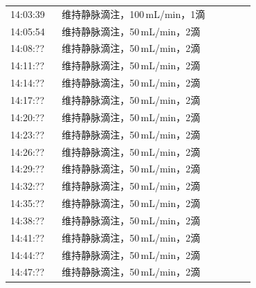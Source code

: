 \documentclass[UTF8,10pt,a4paper,fontset=fandol]{ctexart}
\newcommand{\fieldvalue}[1]{#1}
\begin{document}
\begin{tabular}{p{0.18\linewidth}p{0.68\linewidth}}
14:03:39 & \fieldvalue{维持静脉滴注，100\,mL/min，1滴} \\[2pt]
14:05:54 & \fieldvalue{维持静脉滴注，50\,mL/min，2滴} \\[2pt]
14:08:?? & \fieldvalue{维持静脉滴注，50\,mL/min，2滴} \\[2pt]
14:11:?? & \fieldvalue{维持静脉滴注，50\,mL/min，2滴} \\[2pt]
14:14:?? & \fieldvalue{维持静脉滴注，50\,mL/min，2滴} \\[2pt]
14:17:?? & \fieldvalue{维持静脉滴注，50\,mL/min，2滴} \\[2pt]
14:20:?? & \fieldvalue{维持静脉滴注，50\,mL/min，2滴} \\[2pt]
14:23:?? & \fieldvalue{维持静脉滴注，50\,mL/min，2滴} \\[2pt]
14:26:?? & \fieldvalue{维持静脉滴注，50\,mL/min，2滴} \\[2pt]
14:29:?? & \fieldvalue{维持静脉滴注，50\,mL/min，2滴} \\[2pt]
14:32:?? & \fieldvalue{维持静脉滴注，50\,mL/min，2滴} \\[2pt]
14:35:?? & \fieldvalue{维持静脉滴注，50\,mL/min，2滴} \\[2pt]
14:38:?? & \fieldvalue{维持静脉滴注，50\,mL/min，2滴} \\[2pt]
14:41:?? & \fieldvalue{维持静脉滴注，50\,mL/min，2滴} \\[2pt]
14:44:?? & \fieldvalue{维持静脉滴注，50\,mL/min，2滴} \\[2pt]
14:47:?? & \fieldvalue{维持静脉滴注，50\,mL/min，2滴} \\[2pt]

\end{tabular}
\end{document}
